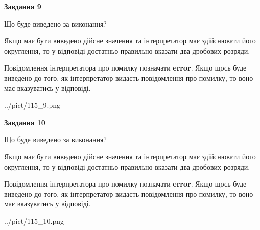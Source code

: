 \documentclass[12pt, ukrainian]{article}
\begin{document}
{\begin {Large}
{\begin {center}\textbf{Завдання 9}\end {center}}\par
Що буде виведено за виконання? \par

Якщо має бути виведено дійсне значення та інтерпретатор має здійснювати його округлення, 
то у відповіді достатньо правильно вказати два дробових розряди.

Повідомлення інтерпретатора про помилку позначати \textbf{error}.
Якщо щось буде виведено до того, як інтерпретатор видасть повідомлення про помилку, 
то воно має вказуватись у відповіді. \par

\begin{center}
	{../pict/115_9.png}
\end{center}
\newpage

{\begin {center}\textbf{Завдання 10}\end {center}}\par
Що буде виведено за виконання? \par

Якщо має бути виведено дійсне значення та інтерпретатор має здійснювати його округлення, 
то у відповіді достатньо правильно вказати два дробових розряди.

Повідомлення інтерпретатора про помилку позначати \textbf{error}.
Якщо щось буде виведено до того, як інтерпретатор видасть повідомлення про помилку, 
то воно має вказуватись у відповіді. \par

\begin{center}
	{../pict/115_10.png}
\end{center}
\newpage

\end {Large}}
\end{document}

